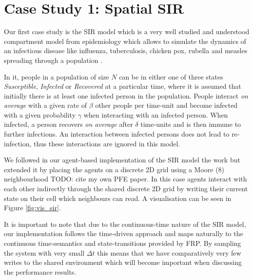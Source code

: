\section{Case Study 1: Spatial SIR} %
\label{sec:cs_sir}

Our first case study is the SIR model which is a very well studied and understood compartment model from epidemiology \cite{kermack_contribution_1927} which allows to simulate the dynamics of an infectious disease like influenza, tuberculosis, chicken pox, rubella and measles spreading through a population \cite{enns_its_2010}.

In it, people in a population of size $N$ can be in either one of three states \textit{Susceptible}, \textit{Infected} or \textit{Recovered} at a particular time, where it is assumed that initially there is at least one infected person in the population. People interact \textit{on average} with a given rate of $\beta$ other people per time-unit and become infected with a given probability $\gamma$ when interacting with an infected person. When infected, a person recovers \textit{on average} after $\delta$ time-units and is then immune to further infections. An interaction between infected persons does not lead to re-infection, thus these interactions are ignored in this model. 

We followed in our agent-based implementation of the SIR model the work \cite{macal_agent-based_2010} but extended it by placing the agents on a discrete 2D grid using a Moore (8) neighbourhood TODO: cite my own PFE paper. In this case agents interact with each other indirectly through the shared discrete 2D grid by writing their current state on their cell which neighbours can read. A visualisation can be seen in Figure \ref{fig:vis_sir}.

It is important to note that due to the continuous-time nature of the SIR model, our implementation follows the time-driven \cite{meyer_event-driven_2014} approach and maps naturally to the continuous time-semantics and state-transitions provided by FRP. By sampling the system with very small $\Delta t$ this means that we have comparatively very few writes to the shared environment which will become important when discussing the performance results.

